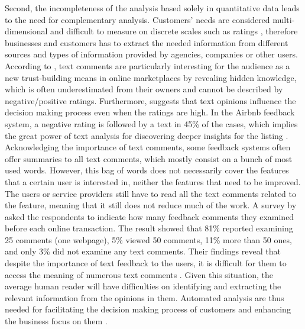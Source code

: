 %
%

Second, the incompleteness of the analysis based solely in quantitative data leads to the need for complementary analysis. Customers' needs are considered multi-dimensional and difficult to measure on discrete scales such as ratings \cite{luo2005information}, therefore businesses and customers has to extract the needed information from different sources and types of information provided by agencies, companies or other users. According to \cite{pavlou2006nature}, text comments are particularly interesting for the audience as a new trust-building means in online marketplaces by revealing hidden knowledge, which is often underestimated from their owners and cannot be described by negative/positive ratings. Furthermore, \cite{fradkin2016bias} suggests that text opinions influence the decision making process even when the ratings are high. In the Airbnb feedback system, a negative rating is followed by a text in 45\% of the cases, which implies the great power of text analysis for discovering deeper insights for the listing \cite{fradkin2016bias}. Acknowledging the importance of text comments, some feedback systems often offer summaries to all text comments, which mostly consist on a bunch of most used words. However, this bag of words does not necessarily cover the features that a certain user is interested in, neither the features that need to be improved. The users or service providers still have to read all the text comments related to the feature, meaning that it still does not reduce much of the  work. A survey by \cite{pavlou2006institutional} asked the respondents to indicate how many feedback comments they examined before each online transaction. The result showed that 81\% reported examining 25 comments (one webpage), 5\% viewed 50 comments, 11\% more than 50 ones, and only 3\% did not examine any text comments. Their findings reveal that despite the importance of text feedback to the users, it is difficult for them to access the meaning of numerous text comments \cite{pavlou2006institutional}. Given this situation, the average human reader will have difficulties on identifying and extracting the relevant information from the opinions in them. Automated analysis are thus needed for facilitating the decision making process of customers and enhancing the business focus on them \cite{liu2012sentiment}.

